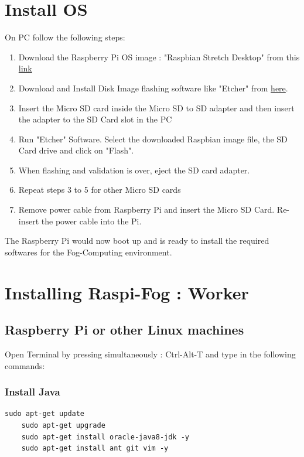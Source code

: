 \documentclass{article}
\begin{document}
\section{Install OS}
On PC follow the following steps:
\begin{enumerate}
\item Download the Raspberry Pi OS image : "Raspbian Stretch Desktop" from this \href{https://downloads.raspberrypi.org/raspbian_latest}{link}
\item Download and Install Disk Image flashing software like "Etcher" from \href{https://etcher.io/}{here}.
\item Insert the Micro SD card inside the Micro SD to SD adapter and then insert the adapter to the SD Card slot in the PC
\item Run "Etcher" Software. Select the downloaded Raspbian image file, the SD Card drive and click on "Flash".
\item When flashing and validation is over, eject the SD card adapter. 
\item Repeat steps 3 to 5 for other Micro SD cards
\item Remove power cable from Raspberry Pi and insert the Micro SD Card. Re-insert the power cable into the Pi.
\end{enumerate}

The Raspberry Pi would now boot up and is ready to install the required softwares for the Fog-Computing environment.

\section{Installing Raspi-Fog : Worker}

\subsection{Raspberry Pi or other Linux machines}
Open Terminal by pressing simultaneously : Ctrl-Alt-T and type in the following commands: 
\subsubsection{Install Java}
\begin{lstlisting}[style=BashInputStyle]
    sudo apt-get update
    sudo apt-get upgrade
    sudo apt-get install oracle-java8-jdk -y
    sudo apt-get install ant git vim -y
\end{lstlisting}
\end{document}
